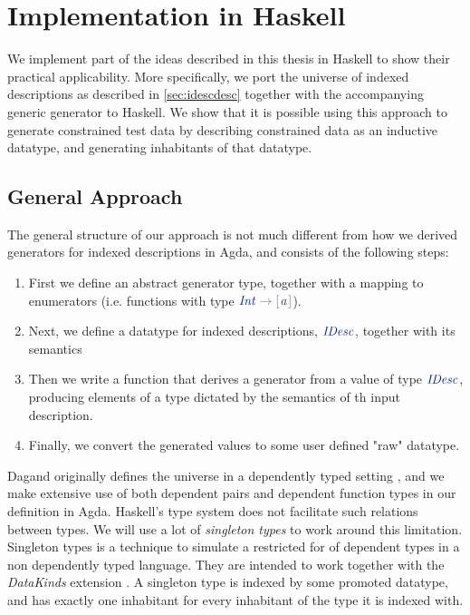 \documentclass[a4paper,msc,twosized=semi]{uustthesis}
\newcommand*{\mathcolor}{}
\def\mathcolor#1#{\mathcoloraux{#1}}
\newcommand*{\mathcoloraux}[3]{%
  \protect\leavevmode
  \begingroup
    \color#1{#2}#3%
  \endgroup
}
\newcommand{\HSSpecial}[1]{\mathcolor{hsblue4}{#1}}
\newcommand{\HSSym}[1]{\mathcolor{hsblue4}{#1}}
\newcommand{\HSCon}[1]{\mathcolor{hsblue3}{\mathit{#1}}}
\newcommand{\HSVar}[1]{\mathcolor{hsblue5}{\mathit{#1}}}
\begin{document}

\chapter{Implementation in Haskell}
We implement part of the ideas described in this thesis in Haskell to show their practical applicability. More specifically, we port the universe of indexed descriptions as described in \cref{sec:idescdesc} together with the accompanying generic generator to Haskell. We show that it is possible using this approach to generate constrained test data by describing constrained data as an inductive datatype, and generating inhabitants of that datatype. 

\section{General Approach}

  The general structure of our approach is not much different from how we derived generators for indexed descriptions in Agda, and consists of the following steps: 

  \begin{enumerate}
    \item 
      First we define an abstract generator type, together with a mapping to enumerators (i.e. functions with type \ensuremath{\HSCon{Int}\HSSym{\to} \HSSpecial{\HSSym{[\mskip1.5mu} }\HSVar{a}\HSSpecial{\HSSym{\mskip1.5mu]}}}). 

    \item 
      Next, we define a datatype for indexed descriptions, \ensuremath{\HSCon{IDesc}}, together with its semantics

    \item 
      Then we write a function that derives a generator from a value of type \ensuremath{\HSCon{IDesc}}, producing elements of a type dictated by the semantics of th input description. 

    \item 
      Finally, we convert the generated values to some user defined "raw" datatype.  
  \end{enumerate}

Dagand originally defines the universe in a dependently typed setting \cite{dagand2013cosmology}, and we make extensive use of both dependent pairs and dependent function types in our definition in Agda. Haskell's type system does not facilitate such relations between types. We will use a lot of \emph{singleton types} \cite{eisenberg2013dependently} to work around this limitation. Singleton types is a technique to simulate a restricted for of dependent types in a non dependently typed language. They are intended to work together with the \emph{DataKinds} extension \cite{ghcdocsdatakinds}. A singleton type is indexed by some promoted datatype, and has exactly one inhabitant for every inhabitant of the type it is indexed with.   
\end{document}
